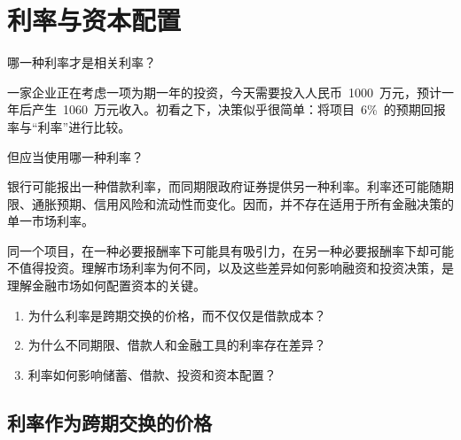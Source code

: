 \chapter{利率与资本配置}
\label{chap:Interest_Rates_and_Capital_Allocation}

\begin{openingcase}{哪一种利率才是相关利率？}

一家企业正在考虑一项为期一年的投资，今天需要投入人民币~1000~万元，预计一年后产生~1060~万元收入。初看之下，决策似乎很简单：将项目~6\%~的预期回报率与“利率”进行比较。

但应当使用哪一种利率？

银行可能报出一种借款利率，而同期限政府证券提供另一种利率。利率还可能随期限、通胀预期、信用风险和流动性而变化。因而，并不存在适用于所有金融决策的单一市场利率。

同一个项目，在一种必要报酬率下可能具有吸引力，在另一种必要报酬率下却可能不值得投资。理解市场利率为何不同，以及这些差异如何影响融资和投资决策，是理解金融市场如何配置资本的关键。

\end{openingcase}

\begin{tcolorbox}[
  enhanced,
  colback=FinanceBlue!6,
  colframe=FinanceBlue,
  boxrule=0.6pt,
  sharp corners,
  left=8pt,
  right=8pt,
  top=7pt,
  bottom=7pt,
  before skip=1em,
  after skip=1.6em,
  title=\textbf{核心问题},
  coltitle=white,
  colbacktitle=FinanceBlue,
  fonttitle=\bfseries,
  attach boxed title to top left={xshift=6pt,yshift=-2mm},
  boxed title style={
    boxrule=0pt,
    sharp corners,
    left=5pt,
    right=5pt,
    top=2pt,
    bottom=2pt
  }
]
\begin{enumerate}[
  leftmargin=*,
  label=\textcolor{FinanceBlue}{\textbf{\arabic*.}},
  itemsep=0.55em,
  topsep=0.2em
]

\item 为什么利率是跨期交换的价格，而不仅仅是借款成本？

\item 为什么不同期限、借款人和金融工具的利率存在差异？

\item 利率如何影响储蓄、借款、投资和资本配置？

\end{enumerate}
\end{tcolorbox}

\section{利率作为跨期交换的价格}

